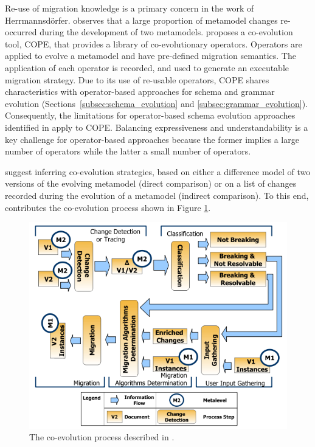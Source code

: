 Re-use of migration knowledge is a primary concern in the work of Herrmannsd\"{o}rfer. \cite{herrmannsdoerfer08automatability} observes that a large proportion of metamodel changes re-occurred during the development of two metamodels. \cite{herrmannsdoerfer09cope} proposes a co-evolution tool, COPE, that provides a library of co-evolutionary operators. Operators are applied to evolve a metamodel and have pre-defined migration semantics. The application of each operator is recorded, and used to generate an executable migration strategy. Due to its use of re-usable operators, COPE shares characteristics with operator-based approaches for schema and grammar evolution (Sections~\ref{subsec:schema_evolution} and \ref{subsec:grammar_evolution}). Consequently, the limitations for operator-based schema evolution approaches identified in \cite{lerner00model} apply to COPE. Balancing expressiveness and understandability is a key challenge for operator-based approaches because the former implies a large number of operators while the latter a small number of operators.

\cite{gruschko07towards} suggest inferring co-evolution strategies, based on either a difference model of two versions of the evolving metamodel (direct comparison) or on a list of changes recorded during the evolution of a metamodel (indirect comparison). To this end, \cite{gruschko07towards} contributes the co-evolution process shown in Figure \ref{fig:coevoprocess}. 

\begin{figure}[htbp]
  \begin{center}
    \leavevmode
    \includegraphics[scale=0.6]{3.LiteratureReview/images/CoEvoProcess.png}
  \end{center}
  \caption[An exemplar co-evolution process]{The co-evolution process described in \cite{gruschko07towards}.}
  \label{fig:coevoprocess}
\end{figure}

